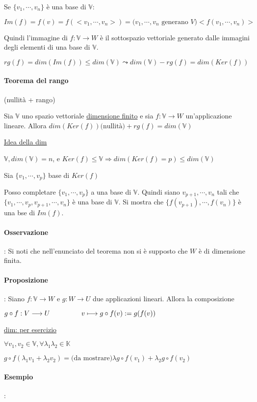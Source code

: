 \documentclass{article}
\newcommand{\ul}[1]{\underline{#1}}
\newcommand{\K}{\mathbb{K}}
\newcommand{\V}{\mathbb{V}}
\begin{document}
Se $\{v_1,\cdots,v_n\}$ è una base di $\V$:

$Im(f)=f(v)=f(<v_1,\cdots,v_n>)=\text{($v_1,\cdots,v_n$ generano $V$)}<f(v_1,\cdots,v_n)>$

Quindi l'immagine di $f:\V\rightarrow W$ è il sottospazio vettoriale generato dalle immagini degli elementi di una base di $\V$.

$rg(f)=dim(Im(f))\le dim(\V)\leadsto dim(\V)-rg(f)=dim(Ker(f))$


\paragraph{Teorema del rango} (nullità + rango)

Sia $\V$ uno spazio vettoriale \ul{dimensione finito} e sia $f:\V\rightarrow W$ un'applicazione lineare. Allora $dim(Ker(f))\text{(nullità)}+rg(f)=dim(\V)$

\ul{Idea della dim}

$\V,dim(\V)=n$, e $Ker(f)\le\V\Rightarrow dim(Ker(f)=p)\le dim(\V)$

Sia $\{v_1,\cdots,v_p\}$ base di $Ker(f)$

Posso completare $\{v_1,\cdots,v_p\}$ a una base di $\V$.
Quindi siano $v_{p+1},\cdots,v_n$ tali che $\{v_1,\cdots,v_p,v_{p+1},\cdots,v_n\}$ è una base di $\V$.
Si mostra che $\{f(v_{p+1}),\cdots,f(v_n)\}$ è una bse di $Im(f)$.
\paragraph{Osservazione}: Si noti che nell'enunciato del teorema non si è supposto che $W$ è di dimensione finita.

\paragraph{Proposizione}: Siano $f:\V\rightarrow W$ e $g:W\rightarrow U$ due applicazioni lineari. Allora la composizione

$g\circ f:V\longrightarrow U\\\hspace*{4.6em}v\longmapsto g\circ f(v):=g(f(v))$

\ul{dim: per esercizio}

$\forall v_1,v_2\in\V,\forall\lambda_1\lambda_2\in\K$

$g\circ f(\lambda_1v_1+\lambda_2v_2)=\text{(da mostrare)}\lambda g\circ f(v_1)+\lambda_2 g\circ f(v_2)$

\paragraph{Esempio}:
\end{document}
